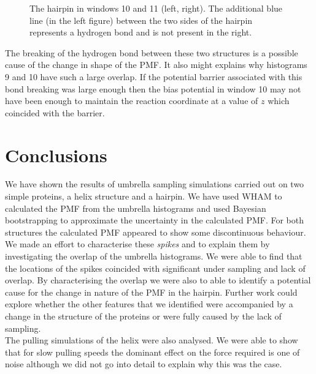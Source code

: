 \documentclass[12pt, onecolumn]{revtex4}    %
\begin{document}
\begin{figure}[h!]
\label{fig: hbondbye}
\caption{The hairpin in windows 10 and 11 (left, right).  The additional blue line (in the left figure) between the two sides of the hairpin represents a hydrogen bond and is not present in the right.}  
\end{figure}

The breaking of the hydrogen bond between these two structures is a possible cause of the change in shape of the PMF.  It also might explains why histograms 9 and 10 have such a large overlap.  If the potential barrier associated with this bond breaking was large enough then the bias potential in window 10 may not have been enough to maintain the reaction coordinate at a value of $z$ which coincided with the barrier.

\section{Conclusions}

We have shown the results of umbrella sampling simulations carried out on two simple proteins, a helix structure and a hairpin.  We have used WHAM to calculated the PMF from the umbrella histograms and used Bayesian bootstrapping to approximate the uncertainty in the calculated PMF.  For both structures the calculated PMF appeared to show some discontinuous behaviour.  We made an effort to characterise these \textit{spikes} and to explain them by investigating the overlap of the umbrella histograms.  We were able to find that the locations of the spikes coincided with significant under sampling and lack of overlap.  By characterising the overlap we were also to able to identify a potential cause for the change in nature of the PMF in the hairpin.  Further work could explore whether the other features that we identified were accompanied by a change in the structure of the proteins or were fully caused by the lack of sampling.\\

The pulling simulations of the helix were also analysed.  We were able to show that for slow pulling speeds the dominant effect on the force required is one of noise although we did not go into detail to explain why this was the case.
\end{document}
